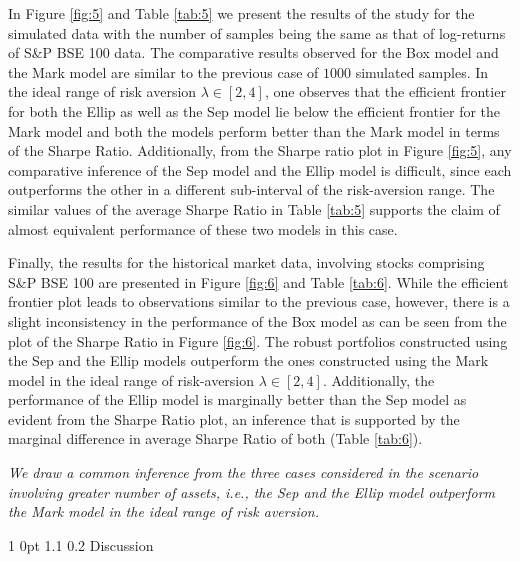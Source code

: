\documentclass[12pt]{article}
\makeatletter
\numberwithin{equation}{section}
\renewcommand{\section}{
  \@startsection
  {section}%
  {1}%
  {0pt}%
  {1.1\baselineskip}%
  {0.2\baselineskip}%
  {\sc \centering}%
}
\makeatother
\begin{document}
In Figure \ref{fig:5} and Table \ref{tab:5} we present the results of the study for the simulated data with the number of samples being the same as that of log-returns of S\&P BSE 100 data. The comparative results observed for the Box model and the Mark model are similar to the previous case of $1000$ simulated samples. In the ideal range of risk aversion $\lambda\in [2,4]$, one observes that the efficient frontier for both the Ellip as well as the Sep model lie below the efficient frontier for the Mark model and both the models perform better than the Mark model in terms of the Sharpe Ratio. Additionally, from the Sharpe ratio plot in Figure \ref{fig:5}, any comparative inference of the Sep model and the Ellip model is difficult, since each outperforms the other in a different sub-interval of the risk-aversion range. The similar values of the average Sharpe Ratio in Table \ref{tab:5} supports the claim of almost equivalent performance of these two models in this case.

Finally, the results for the historical market data, involving stocks comprising S\&P BSE 100 are presented in Figure \ref{fig:6} and Table \ref{tab:6}. While the efficient frontier plot leads to observations similar to the previous case, however, there is a slight inconsistency in the performance of the Box model as can be seen from the plot of the Sharpe Ratio in Figure \ref{fig:6}. The robust portfolios constructed using the Sep and the Ellip models outperform the ones constructed using the Mark model in the ideal range of risk-aversion $\lambda\in [2,4]$. Additionally, the performance of the Ellip model is marginally better than the Sep model as evident from the Sharpe Ratio plot, an inference that is supported by the marginal difference in average Sharpe Ratio of both (Table \ref{tab:6}).

\textit{We draw a common inference from the three cases considered in the scenario involving greater number of assets, \textit{i.e.}, the Sep and the Ellip model outperform the Mark model in the ideal range of risk aversion.}

\section{Discussion}
\label{Discussion}
\end{document}
